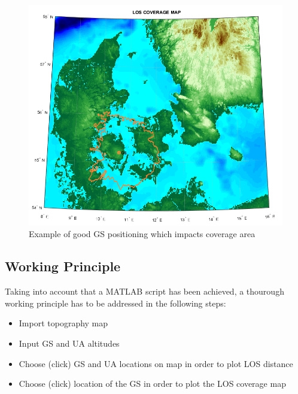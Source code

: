 \begin{figure}[H]
	\centering
	\includegraphics[scale=0.70]{figures/los_odense.png}
	\caption{Example of good GS positioning which impacts coverage area}
   	\label{fig:los_odense}
\end{figure}

\subsection{Working Principle}
Taking into account that a MATLAB script has been achieved, a thourough working principle has to be addressed in the following steps:
\begin{itemize}
	\item Import topography map 
	\item Input GS and UA altitudes
	\item Choose (click) GS and UA locations on map in order to plot LOS distance
	\item Choose (click) location of the GS in order to plot the LOS coverage map
\end{itemize}